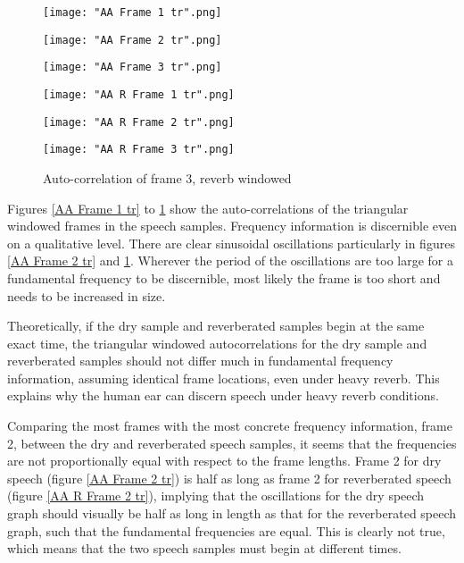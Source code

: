\documentclass[12pt]{article}
\begin{document}
\begin{figure}[H]
	\texttt{[image: "AA Frame 1 tr".png]}
	\caption{Auto-correlation of frame 1, dry, windowed}\label{AA Frame 1 tr}
	\endminipage\hfill
	\texttt{[image: "AA Frame 2 tr".png]}
	\caption{Auto-correlation of frame 2, dry, windowed}\label{AA Frame 2 tr}
	\endminipage\hfill
	\texttt{[image: "AA Frame 3 tr".png]}
	\caption{Auto-correlation of frame 3, dry,  windowed}\label{AA Frame 3 tr}
	\endminipage\hfill
	\texttt{[image: "AA R Frame 1 tr".png]}
	\caption{Auto-correlation of frame 1, reverb, windowed}\label{AA R Frame 1 tr}
	\endminipage\hfill
	\texttt{[image: "AA R Frame 2 tr".png]}
	\caption{Auto-correlation of frame 2, reverb, windowed}\label{AA R Frame 2 tr}
	\endminipage\hfill
	\texttt{[image: "AA R Frame 3 tr".png]}
	\caption{Auto-correlation of frame 3, reverb windowed}\label{AA R Frame 3 tr}
	\endminipage\hfill
\end{figure}

Figures \ref{AA Frame 1 tr} to \ref{AA R Frame 3 tr} show the auto-correlations of the triangular windowed frames in the speech samples. Frequency information is discernible even on a qualitative level. There are clear sinusoidal oscillations particularly in figures \ref{AA Frame 2 tr} and \ref{AA R Frame 3 tr}. Wherever the period of the oscillations are too large for a fundamental frequency to be discernible, most likely the frame is too short and needs to be increased in size.\newline

Theoretically, if the dry sample and reverberated samples begin at the same exact time, the triangular windowed autocorrelations for the dry sample and reverberated samples should not differ much in fundamental frequency information, assuming identical frame locations, even under heavy reverb\cite{aa}. This explains why the human ear can discern speech under heavy reverb conditions\cite{aa}.\newline

Comparing the most frames with the most concrete frequency information, frame 2, between the dry and reverberated speech samples, it seems that the frequencies are not proportionally equal with respect to the frame lengths. Frame 2 for dry speech (figure \ref{AA Frame 2 tr}) is half as long as frame 2 for reverberated speech (figure \ref{AA R Frame 2 tr}), implying that the oscillations for the dry speech graph should visually be half as long in length as that for the reverberated speech graph, such that the fundamental frequencies are equal. This is clearly not true, which means that the two speech samples must begin at different times.
\end{document}
